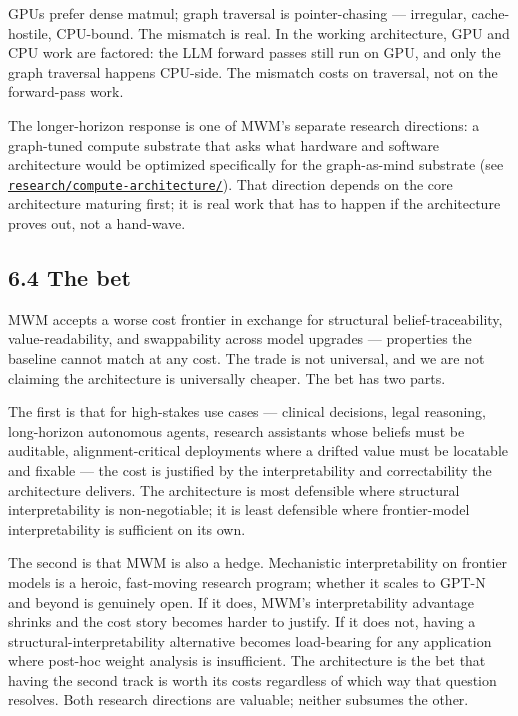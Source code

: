 \documentclass[12pt]{article}
\begin{document}
GPUs prefer dense matmul; graph traversal is pointer-chasing --- irregular, cache-hostile, CPU-bound. The mismatch is real. In the working architecture, GPU and CPU work are factored: the LLM forward passes still run on GPU, and only the graph traversal happens CPU-side. The mismatch costs on traversal, not on the forward-pass work.

The longer-horizon response is one of MWM's separate research directions: a graph-tuned compute substrate that asks what hardware and software architecture would be optimized specifically for the graph-as-mind substrate (see \href{../research/compute-architecture/}{\texttt{research/compute-architecture/}}). That direction depends on the core architecture maturing first; it is real work that has to happen if the architecture proves out, not a hand-wave.

\subsection{6.4 The bet}\label{the-bet}

MWM accepts a worse cost frontier in exchange for structural belief-traceability, value-readability, and swappability across model upgrades --- properties the baseline cannot match at any cost. The trade is not universal, and we are not claiming the architecture is universally cheaper. The bet has two parts.

The first is that for high-stakes use cases --- clinical decisions, legal reasoning, long-horizon autonomous agents, research assistants whose beliefs must be auditable, alignment-critical deployments where a drifted value must be locatable and fixable --- the cost is justified by the interpretability and correctability the architecture delivers. The architecture is most defensible where structural interpretability is non-negotiable; it is least defensible where frontier-model interpretability is sufficient on its own.

The second is that MWM is also a hedge. Mechanistic interpretability on frontier models is a heroic, fast-moving research program; whether it scales to GPT-N and beyond is genuinely open. If it does, MWM's interpretability advantage shrinks and the cost story becomes harder to justify. If it does not, having a structural-interpretability alternative becomes load-bearing for any application where post-hoc weight analysis is insufficient. The architecture is the bet that having the second track is worth its costs regardless of which way that question resolves. Both research directions are valuable; neither subsumes the other.
\end{document}
